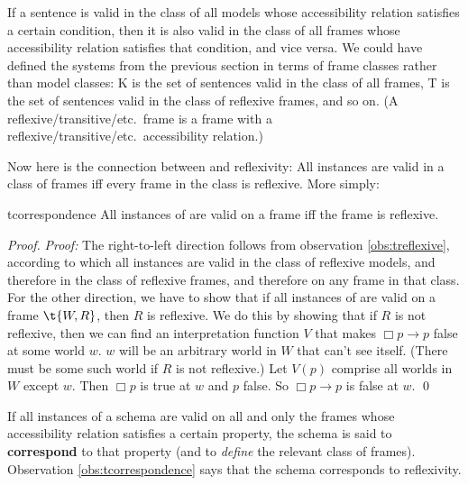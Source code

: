 If a sentence is valid in the class of all models whose accessibility relation
satisfies a certain condition, then it is also valid in the class of all frames
whose accessibility relation satisfies that condition, and vice versa. We could
have defined the systems from the previous section in terms of frame classes
rather than model classes: K is the set of sentences valid in the class of all
frames, T is the set of sentences valid in the class of reflexive frames, and so
on. (A reflexive/transitive/etc.\ frame is a frame with a
reflexive/transitive/etc.\ accessibility relation.)

Now here is the connection between  and reflexivity: All  instances
are valid in a class of frames iff every frame in the class is reflexive. More
simply:

\begin{observation}{tcorrespondence}
  All instances of  are valid on a frame iff the frame is reflexive.
\end{observation}
%
\begin{proof}
  \emph{Proof:} The right-to-left direction follows from observation
  \ref{obs:treflexive}, according to which all  instances are valid in the
  class of reflexive models, and therefore in the class of reflexive frames, and
  therefore on any frame in that class. For the other direction, we have to show
  that if all instances of  are valid on a frame $\t{W,R}$, then $R$ is
  reflexive. We do this by showing that if $R$ is not reflexive, then we can
  find an interpretation function $V$ that makes $\Box p \to p$ false at some
  world $w$. $w$ will be an arbitrary world in $W$ that can't see itself. (There
  must be some such world if $R$ is not reflexive.) Let $V(p)$ comprise all
  worlds in $W$ except $w$. Then $\Box p$ is true at $w$ and $p$ false. So
  $\Box p \to p$ is false at $w$. \qed
\end{proof}

If all instances of a schema are valid on all and only the frames whose
accessibility relation satisfies a certain property, the schema is said to
\textbf{correspond} to that property (and to \emph{define} the relevant class of
frames). Observation \ref{obs:tcorrespondence} says that the  schema
corresponds to reflexivity.

 
